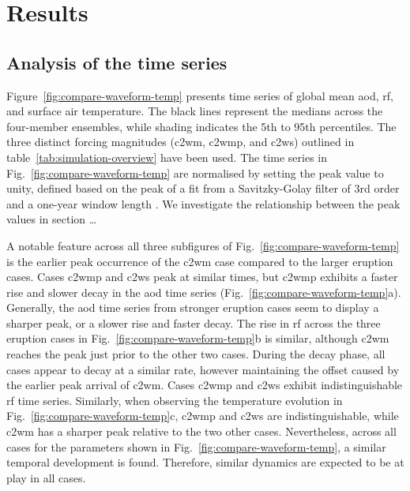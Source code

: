\documentclass{ametsocV6.1}
\begin{document}
\section{Results}\label{sec:results}


\subsection{Analysis of the time series}

Figure~\ref{fig:compare-waveform-temp} presents time series of global mean \gls{aod},
\gls{rf}, and surface air temperature. The black lines represent the medians across the
four-member ensembles, while shading indicates the 5th to 95th percentiles. The three
distinct forcing magnitudes (\gls{c2wm}, \gls{c2wmp}, and \gls{c2ws}) outlined in
table~\ref{tab:simulation-overview} have been used. The time series in
Fig.~\ref{fig:compare-waveform-temp} are normalised by setting the peak value to unity,
defined based on the peak of a fit from a Savitzky-Golay filter of 3rd order and a
one-year window length \citep{savitzky1964}. We investigate the relationship between the peak values in section \dots

A notable feature across all three subfigures of Fig.~\ref{fig:compare-waveform-temp} is
the earlier peak occurrence of the \gls{c2wm} case compared to the larger eruption
cases. Cases \gls{c2wmp} and \gls{c2ws} peak at similar times, but \gls{c2wmp} exhibits
a faster rise and slower decay in the \gls{aod} time series
(Fig.~\ref{fig:compare-waveform-temp}a). Generally, the \gls{aod} time series from
stronger eruption cases seem to display a sharper peak, or a slower rise and faster
decay. The rise in \gls{rf} across the three eruption cases in Fig.~\ref{fig:compare-waveform-temp}b
is similar, although \gls{c2wm} reaches the peak just prior to the other two cases.
During the decay phase, all cases appear to decay at a similar rate, however maintaining
the offset caused by the earlier peak arrival of \gls{c2wm}. Cases \gls{c2wmp} and
\gls{c2ws} exhibit indistinguishable \gls{rf} time series. Similarly, when observing the
temperature evolution in Fig.~\ref{fig:compare-waveform-temp}c, \gls{c2wmp} and
\gls{c2ws} are indistinguishable, while \gls{c2wm} has a sharper peak relative to the
two other cases. Nevertheless, across all cases for the parameters shown in
Fig.~\ref{fig:compare-waveform-temp}, a similar temporal development is found.
Therefore, similar dynamics are expected to be at play in all cases.
\end{document}
